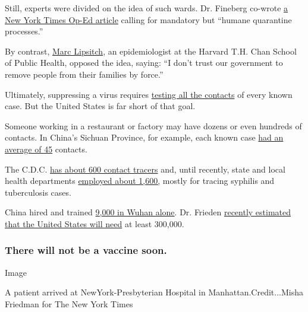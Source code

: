 Still, experts were divided on the idea of such wards. Dr. Fineberg
co-wrote
\href{https://www.nytimes3xbfgragh.onion/2020/04/07/opinion/coronavirus-smart-quarantine.html}{a
New York Times Op-Ed article} calling for mandatory but ``humane
quarantine processes.''

By contrast, \href{https://www.hsph.harvard.edu/marc-lipsitch/}{Marc
Lipsitch}, an epidemiologist at the Harvard T.H. Chan School of Public
Health, opposed the idea, saying: ``I don't trust our government to
remove people from their families by force.''

Ultimately, suppressing a virus requires
\href{https://www.centerforhealthsecurity.org/our-work/pubs_archive/pubs-pdfs/2020/a-national-plan-to-enable-comprehensive-COVID-19-case-finding-and-contact-tracing-in-the-US.pdf}{testing
all the contacts} of every known case. But the United States is far
short of that goal.

Someone working in a restaurant or factory may have dozens or even
hundreds of contacts. In China's Sichuan Province, for example, each
known case
\href{https://www.who.int/docs/default-source/coronaviruse/who-china-joint-mission-on-covid-19-final-report.pdf}{had
an average of 45} contacts.

The C.D.C.
\href{https://www.npr.org/sections/health-shots/2020/04/10/831200054/cdc-director-very-aggressive-contact-tracing-needed-for-u-s-to-return-to-normal}{has
about 600 contact tracers} and, until recently, state and local health
departments
\href{https://www.ncsddc.org/an-army-of-contact-tracers-will-bend-the-covid-19-curve/}{employed
about 1,600,} mostly for tracing syphilis and tuberculosis cases.

China hired and trained
\href{https://www.who.int/docs/default-source/coronaviruse/who-china-joint-mission-on-covid-19-final-report.pdf}{9,000
in Wuhan alone}. Dr. Frieden
\href{https://www.nytimes3xbfgragh.onion/2020/04/12/opinion/cdc-coronavirus.html}{recently
estimated that the United States will need} at least 300,000.

\hypertarget{there-will-not-be-a-vaccine-soon}{%
\subsubsection{There will not be a vaccine
soon.}\label{there-will-not-be-a-vaccine-soon}}

Image

A patient arrived at NewYork-Presbyterian Hospital in
Manhattan.Credit...Misha Friedman for The New York Times

